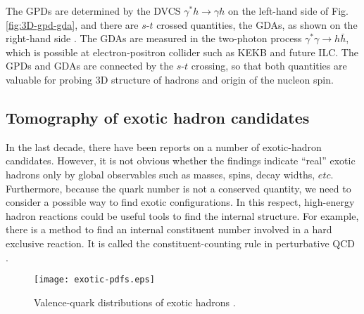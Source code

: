 \documentclass{PoS}
\begin{document}
The GPDs are determined by the DVCS $\gamma^* h \to \gamma h$
on the left-hand side of Fig.\,\ref{fig:3D-gpd-gda}, 
and there are $s$-$t$ crossed quantities,
the GDAs, as shown on the right-hand side \cite{kk-2014,kst-2018}.
The GDAs are measured in the two-photon process 
$\gamma^* \gamma \to h \bar h$, which is possible
at electron-positron collider such as KEKB and future ILC.
The GPDs and GDAs are connected by the $s$-$t$ crossing, so that
both quantities are valuable for probing 3D structure of hadrons
and origin of the nucleon spin.

\subsection{Tomography of exotic hadron candidates}
\label{exotics}

In the last decade, there have been reports on a number of 
exotic-hadron candidates. However, it is not obvious whether
the findings indicate ``real'' exotic hadrons only by
global observables such as masses, spins, decay widths, $etc$.
Furthermore, because the quark number is not a conserved quantity,
we need to consider a possible way to find exotic configurations. 
In this respect, high-energy hadron reactions could be useful tools to find 
the internal structure. For example, there is a method to
find an internal constituent number involved in 
a hard exclusive reaction. It is called the constituent-counting rule
in perturbative QCD \cite{counting}.

\vfill\eject

\begin{wrapfigure}[11]{r}{0.40\textwidth}
    \hspace{-0.30cm}
\begin{minipage}[c]{0.40\textwidth}
    \vspace{0.10cm}
   \begin{center}
     \texttt{[image: exotic-pdfs.eps]}
   \end{center}
\vspace{-0.75cm}
\caption{Valence-quark distributions of exotic hadrons \cite{kk-2014}.}
\label{fig:exotic-pdfs}
\vspace{-0.60cm}
\end{minipage}
\end{wrapfigure}
\end{document}
